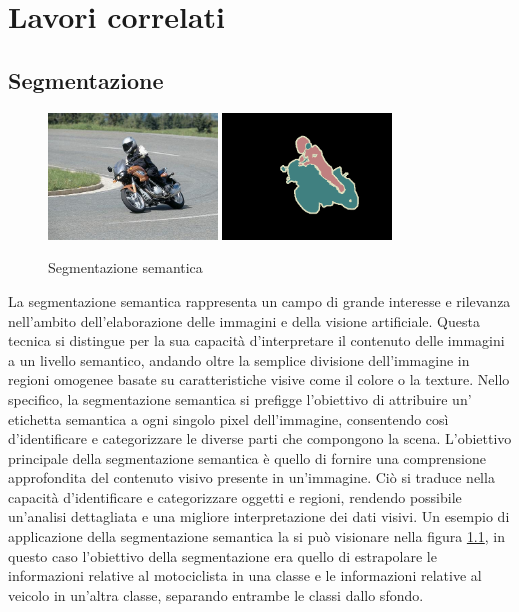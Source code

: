 \chapter{Lavori correlati} \label{chap:related_works}
\section{Segmentazione} \label{sec:segmentazione}

\begin{figure}[!ht]
	\begin{center}
		\includegraphics[width=0.4\textwidth]{Immagini/segmantion_example_image.png}
		\includegraphics[width=0.4\textwidth]{Immagini/segmantion_example_mask.png}
	\end{center}
	\caption{Segmentazione semantica}
	\label{fig:segmentazione}
\end{figure}

La segmentazione semantica rappresenta un campo di grande interesse e rilevanza
nell'ambito dell'elaborazione delle immagini e della visione artificiale.
Questa tecnica si distingue per la sua capacità d'interpretare il contenuto
delle immagini a un livello semantico, andando oltre la semplice divisione
dell'immagine in regioni omogenee basate su caratteristiche visive come il
colore o la texture. Nello specifico, la segmentazione semantica si prefigge
l'obiettivo di attribuire un' etichetta semantica a ogni singolo pixel
dell'immagine, consentendo così d'identificare e categorizzare le diverse parti
che compongono la scena.  L'obiettivo principale della segmentazione semantica
è quello di fornire una comprensione approfondita del contenuto visivo presente
in un'immagine. Ciò si traduce nella capacità d'identificare e categorizzare
oggetti e regioni, rendendo possibile un'analisi dettagliata e una migliore
interpretazione dei dati visivi. Un esempio di applicazione della segmentazione
semantica la si pu\`o visionare nella figura \ref{fig:segmentazione}, in questo
caso l'obiettivo della segmentazione era quello di estrapolare le informazioni
relative al motociclista in una classe e le informazioni relative al veicolo in
un'altra classe, separando entrambe le classi dallo sfondo.


